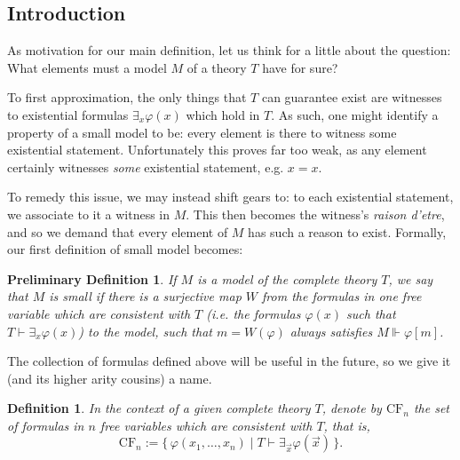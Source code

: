 \documentclass{article}
\newtheorem{prelimdef}{Preliminary Definition}
\newtheorem{definition}{Definition}
\theoremstyle{nonumberplain}
\newcommand{\CF}{\mathrm{CF}}
\begin{document}
\subsection{Introduction}

As motivation for our main definition, let us think for a little about the question: What elements must a model $M$ of a theory $T$ have for sure?

To first approximation, the only things that $T$ can guarantee exist are witnesses to existential formulas $\exists_x \varphi(x)$ which hold in $T$. As such, one might identify a property of a small model to be: every element is there to witness some existential statement. Unfortunately this proves far too weak, as any element certainly witnesses \emph{some} existential statement, e.g. $x = x$.

To remedy this issue, we may instead shift gears to: to each existential statement, we associate to it a witness in $M$. This then becomes the witness's \textit{raison d'etre}, and so we demand that every element of $M$ has such a reason to exist. Formally, our first definition of small model becomes:
\begin{prelimdef}\label{pd:1}
If $M$ is a model of the complete theory $T$, we say that $M$ is small if there is a \emph{surjective} map $W$ from the formulas in one free variable which are consistent with $T$ (i.e. the formulas $\varphi(x)$ such that $T \vdash \exists_x \varphi(x)$) to the model, such that $m = W(\varphi)$ always satisfies $M \Vdash \varphi[m]$.
\end{prelimdef}

The collection of formulas defined above will be useful in the future, so we give it (and its higher arity cousins) a name.
\begin{definition}
In the context of a given complete theory $T$, denote by $\CF_n$ the set of formulas in $n$ free variables which are consistent with $T$, that is,
\begin{equation}
\CF_n := \{\, \varphi(x_1, \dots, x_n) \mid T \vdash \exists_{\vec x} \varphi(\vec x) \,\}.
\end{equation}
\end{definition}
\end{document}
